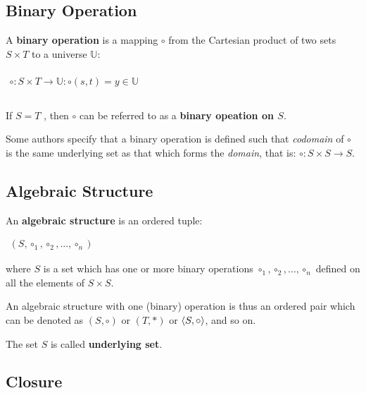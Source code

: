 
\subsection{Binary Operation}
\label{sec:binary-operation}

A \textbf{binary operation} is a mapping $\circ$ from the Cartesian
product of two sets $S \times T$ to a universe $\mathbb{U}$:

\begin{math}
  \begin{array}{c}
    \\
    \circ: S \times T \to \mathbb{U} : \circ(s, t) = y \in \mathbb{U} \\
    \\
  \end{array}
\end{math}

If $S = T$ , then $\circ$ can be referred to as a \textbf{binary
  opeation on $S$}.

Some authors specify that a binary operation is defined such that
\textit{codomain} of $\circ$ is the same underlying set as that which
forms the \textit{domain}, that is: $\circ: S \times S \to S$.


\subsection{Algebraic Structure}
\label{sec:algebraic-structure}

An \textbf{algebraic structure} is an ordered tuple:

\begin{math}
  \begin{array}{c}
    (S, \circ_1, \circ_2, ..., \circ_n)
  \end{array}
\end{math}

where $S$ is a set which has one or more binary operations
$\circ_1, \circ_2, ..., \circ_n$ defined on all the elements of
$S \times S$.

An algebraic structure with one (binary) operation is thus an ordered
pair which can be denoted as $(S, \circ)$ or $(T, *)$ or
$\langle S, \circ \rangle$, and so on.

The set $S$ is called \textbf{underlying set}.


\subsection{Closure}
\label{sec:closure}

